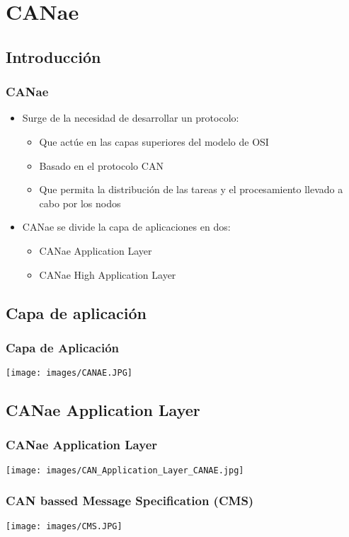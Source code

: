 \section{CANae}
\subsection{Introducción}
\begin{frame}
	\frametitle{CANae}
	\begin{itemize}
		\item Surge de la necesidad de desarrollar un protocolo:
		\begin{itemize}
			\item Que actúe en las capas superiores del modelo de OSI
			\item Basado en el protocolo CAN
			\item Que permita la distribución de las tareas y el procesamiento llevado a cabo por los nodos
		\end{itemize}
		\item CANae se divide la capa de aplicaciones en dos:
		\begin{itemize}
			\item CANae Application Layer
			\item CANae High Application Layer
		\end{itemize}
	\end{itemize}
\end{frame}

\subsection{Capa de aplicación}
\begin{frame}
	\frametitle{Capa de Aplicación}
	\centering
	\texttt{[image: images/CANAE.JPG]}
\end{frame}

\subsection{CANae Application Layer}
\begin{frame}
	\frametitle{CANae Application Layer}
	\centering
	\texttt{[image: images/CAN\_Application\_Layer\_CANAE.jpg]}
\end{frame}

\begin{frame}
	\frametitle{CAN bassed Message Specification (CMS)}
	\centering
	\texttt{[image: images/CMS.JPG]}
\end{frame}

